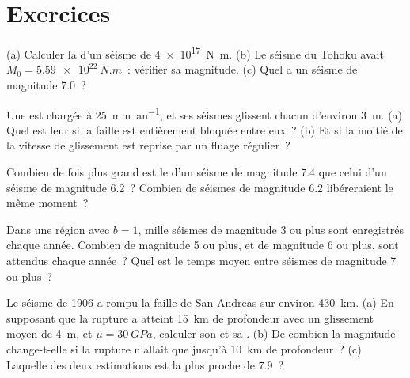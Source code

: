 \section{Exercices}

\begin{exercise}[$\star$]\label{exo:b1:earthquake-source:1}
(a) Calculer la  d'un séisme de 
\qty{4e17}{N.m}. (b) Le séisme du Tohoku avait $M_0 = \qty{5.59e22}{N.m}$~:
vérifier sa magnitude. (c) Quel  a un séisme de magnitude
7.0~?
\end{exercise}

\begin{exercise}[$\star$]\label{exo:b1:earthquake-source:2}
Une  est chargée à \qty{25}{mm.an^{-1}}, et ses séismes
glissent chacun d'environ \qty{3}{m}. (a) Quel est leur  si la
faille est entièrement bloquée entre eux~? (b) Et si la moitié de la vitesse de glissement est reprise
par un fluage régulier~?
\end{exercise}

\begin{exercise}[$\star$]\label{exo:b1:earthquake-source:3}
Combien de fois plus grand est le  d'un séisme de magnitude 7.4
que celui d'un séisme de magnitude 6.2~? Combien de séismes de magnitude
6.2 libéreraient le même moment~?
\end{exercise}

\begin{exercise}[$\star$]\label{exo:b1:earthquake-source:4}
Dans une région avec $b = 1$, mille séismes de magnitude 3 ou plus sont
enregistrés chaque année. Combien de magnitude 5 ou plus, et de magnitude 6 ou
plus, sont attendus chaque année~? Quel est le temps moyen entre séismes de
magnitude 7 ou plus~?
\end{exercise}

\begin{exercise}[$\star\star$]\label{exo:b1:earthquake-source:5}
Le séisme de 1906 a rompu la faille de San Andreas sur environ \qty{430}{km}.
(a) En supposant que la rupture a atteint \qty{15}{km} de profondeur avec un glissement moyen de
\qty{4}{m}, et $\mu = \qty{30}{GPa}$, calculer son  et sa . (b) De combien la magnitude change-t-elle si la rupture n'allait que
jusqu'à \qty{10}{km} de profondeur~? (c) Laquelle des deux estimations est la plus proche de 7.9~?
\end{exercise}

